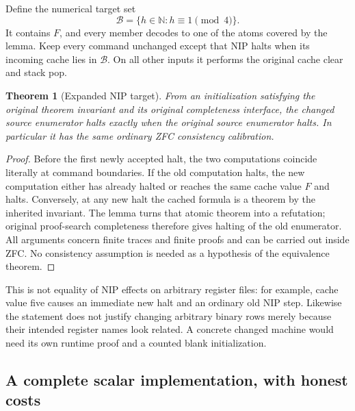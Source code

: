 \documentclass[11pt]{article}
\newtheorem{theorem}{Theorem}
\begin{document}
Define the numerical target set
\[
 \mathcal B=\{h\in\mathbb N:h\equiv1\pmod4\}.
\]
It contains \(F\), and every member decodes to one of the atoms covered by the
lemma. Keep every command unchanged except that NIP halts when its incoming
cache lies in \(\mathcal B\). On all other inputs it performs the original
cache clear and stack pop.

\begin{theorem}[Expanded NIP target]
From an initialization satisfying the original theorem invariant and its
original completeness interface, the changed source enumerator halts exactly
when the original source enumerator halts. In particular it has the same
ordinary ZFC consistency calibration.
\end{theorem}
\begin{proof}
Before the first newly accepted halt, the two computations coincide literally
at command boundaries. If the old computation halts, the new computation
either has already halted or reaches the same cache value \(F\) and halts.
Conversely, at any new halt the cached formula is a theorem by the inherited
invariant. The lemma turns that atomic theorem into a refutation; original
proof-search completeness therefore gives halting of the old enumerator.
All arguments concern finite traces and finite proofs and can be carried out
inside ZFC. No consistency assumption is needed as a hypothesis of the
equivalence theorem.
\end{proof}

This is not equality of NIP effects on arbitrary register files: for example,
cache value five causes an immediate new halt and an ordinary old NIP step.
Likewise the statement does not justify changing arbitrary binary rows merely
because their intended register names look related. A concrete changed machine
would need its own runtime proof and a counted blank initialization.

\subsection{A complete scalar implementation, with honest costs}
\end{document}
